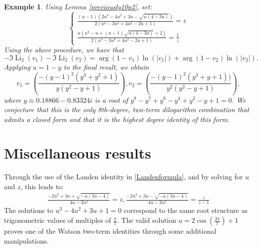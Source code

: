 \documentclass[12pt]{article}
\newtheorem{example}{Example}
\begin{document}
\begin{example}
 Using Lemma \ref{previously10p2}, set: 
\begin{equation*}
\left\{
\begin{aligned}
\frac{(u-1) \left(2 u^3 - 4 u^2 + 3 u - \sqrt{u(4 - 3 u)}\right)}{2 \left(u^4 - 3 u^3 + 4 u^2 - 2 u + 1\right)} = z\\
\frac{u \left(u^2 - u + (u-1) \sqrt{u(4-3u)} + 2\right)}{2 \left(u^4 - 3 u^3 + 4 u^2 - 2 u + 1\right)} = \frac{1}{z}
\end{aligned}
\right.
\end{equation*}
 Using the above procedure, we have that 
\begin{equation*}
 - \Im \operatorname{Li}_2(v_1) - \Im \operatorname{Li}_2(v_2) = \arg(1 - v_1) \ln(|v_1|) + \arg(1 - v_2) \ln(|v_2|). 
\end{equation*}
 Applying $u=1-y$ to the final result, we obtain 
\begin{equation*}
v_1=\left( \frac{-(y - 1)^2 (y^3 + y^2 + 1)}{y (y^2 - y + 1)} \right),
v_2=\left( \frac{-(y - 1)^2 (y^3 + y + 1))}{y^2 (y^2 - y + 1)} \right), 
\end{equation*}
 where $y \approx 0.18866 - 0.83324 i$ is a root of $ y^8 - y^7 + y^6 - y^4 + y^2 - y + 1 = 0$. We conjecture that this is the only 
 8th-degree, two-term dilogarithm combination that admits a closed form and that it is the highest degree identity of this form. 
\end{example}

\section{Miscellaneous results} 
 Through the use of the Landen identity in \eqref{Landenformula}, and by solving for $u$ and $z$, this leads to: 
\begin{equation*}
\begin{aligned}
\frac{-2u^2 + 3u + \sqrt{-u (3u - 4)}}{4u - 2u^2} = z,
\frac{-2u^2 + 3u - \sqrt{-u (3u - 4)}}{4u - 2u^2} = \frac{z}{z - 1}
\end{aligned}
\end{equation*}
 The solutions to $u^3 - 4 u^2 + 3 u + 1 = 0$ correspond to the same root structure as trigonometric values of multiples of 
 $\frac{\pi}{7}$. The valid solution $u=2\cos (\frac{3\pi}{7})+1$ proves one of
 the Watson two-term identities through some additional manipulations.
\end{document}
